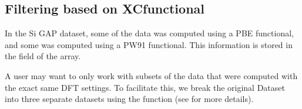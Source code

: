 \documentclass[letterpaper,10pt,english]{sphinxmanual}
\begin{document}
\begin{sphinxVerbatim}[commandchars=\\\{\}]
 
 
 
\end{sphinxVerbatim}


\subsection{Filtering based on XC\sphinxhyphen{}functional}
\label{\detokenize{si_prx_gap:filtering-based-on-xc-functional}}
\sphinxAtStartPar
In the Si GAP dataset, some of the data was computed using a PBE functional,
and some was computed using a PW91 functional. This information is stored in the
 field of the  array.

\begin{sphinxVerbatim}[commandchars=\\\{\}]
\end{sphinxVerbatim}

\sphinxAtStartPar
A user may want to only work with subsets of the data that were computed with
the exact same DFT settings. To facilitate this, we break the original Dataset
into three separate datasets using the
{\hyperref[\detokenize{dataset:colabfit.tools.dataset.Dataset.filter}]{}} function (see {\hyperref[\detokenize{usage:filtering-a-dataset}]{}} for more details).
\end{document}
